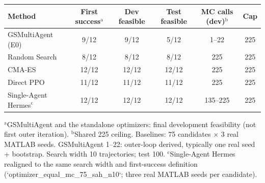 \begin{tabular}{lccccc}
\hline
Method & First success$^{\mathrm{a}}$ & Dev feasible & Test feasible & MC calls (dev)$^{\mathrm{b}}$ & Cap \\
\hline
GSMultiAgent (E0) & 9/12 & 9/12 & 5/12 & 1--22 & 225 \\
Random Search & 8/12 & 8/12 & 8/12 & 225 & 225 \\
CMA-ES & 12/12 & 12/12 & 12/12 & 225 & 225 \\
Direct PPO & 11/12 & 11/12 & 11/12 & 225 & 225 \\
Single-Agent Hermes$^{\mathrm{c}}$ & 12/12 & 12/12 & 12/12 & 135--225 & 225 \\
\hline
\end{tabular}

{\raggedright\footnotesize
$^{\mathrm{a}}$GSMultiAgent and the standalone optimizers: final development feasibility (not first outer iteration).
$^{\mathrm{b}}$Shared 225 ceiling. Baselines: 75 candidates $\times$ 3 real MATLAB seeds. GSMultiAgent 1--22: outer-loop derived, typically one real seed + bootstrap. Search width 10 trajectories; test 100.
$^{\mathrm{c}}$Single-Agent Hermes realigned to the same search width and first-success definition (`optimizer_equal_mc_75_sah_n10`; three real MATLAB seeds per candidate).
\par}
